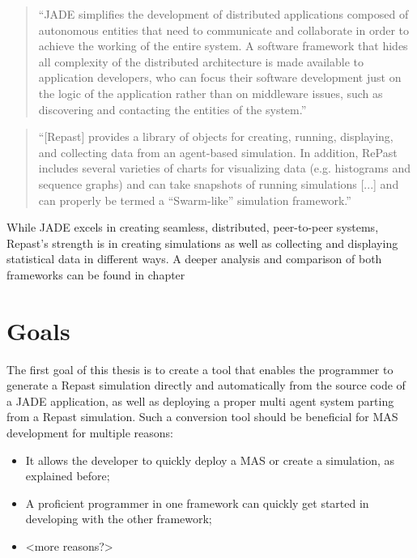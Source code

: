 \begin{quote}
	``JADE simplifies the development of distributed applications composed of autonomous entities that need to communicate and collaborate in order to achieve the working of the entire system. A software framework that hides all complexity of the distributed architecture is made available to application developers, who can focus their software development just on the logic of the application rather than on middleware issues, such as discovering and contacting the entities of the system.'' \cite{bellifemine2003jade}
\end{quote}

\begin{quote}
	``[Repast] provides a library of objects for creating, running, displaying, and collecting data from an agent-based simulation. In addition, RePast includes several varieties of charts for visualizing data (e.g. histograms and sequence graphs) and can take snapshots of running simulations [...] and can properly be termed a “Swarm-like” simulation framework.''
	\cite{collier2003repast}
\end{quote}

While JADE excels in creating seamless, distributed, peer-to-peer systems,
Repast's strength is in creating simulations as well as collecting and displaying statistical data in different ways.
A deeper analysis and comparison of both frameworks can be found in chapter
\label{chap:jaderepast}

\section{Goals}
The first goal of this thesis is to create a tool that enables the programmer to generate a Repast simulation directly and automatically from the source code of a JADE application, as well as deploying a proper multi agent system parting from a Repast simulation.
Such a conversion tool should be beneficial for MAS development for multiple
reasons:

\begin{itemize}
  \item It allows the developer to quickly deploy a MAS or create a simulation, as explained before;
  \item A proficient programmer in one framework can quickly get started in
  developing with the other framework;
  \item <more reasons?>
\end{itemize}

